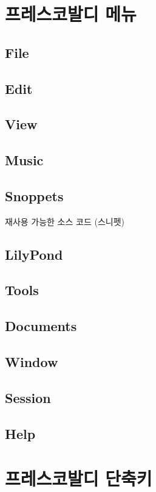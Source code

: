 \documentclass[12pt, a4paper, oneside]{book}
\let\stdsection\section
\renewcommand\section{\newpage\stdsection}
\begin{document}
	\section{프레스코발디 메뉴}

	\subsection{File}
	\subsection{Edit}
	\subsection{View}
	\subsection{Music}
	\subsection{Snoppets}
		재사용 가능한 소스 코드 (스니펫)

	\subsection{LilyPond}
	\subsection{Tools}
	\subsection{Documents}
	\subsection{Window}
	\subsection{Session}
	\subsection{Help}





	\section{프레스코발디 단축키}
\end{document}
